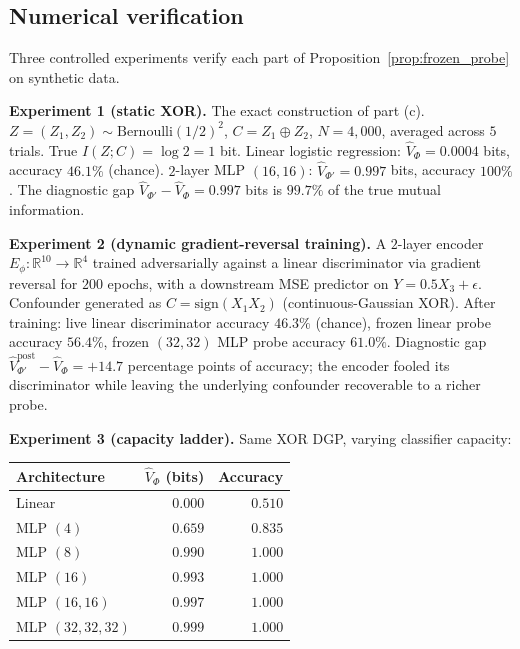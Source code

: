 \documentclass{article}
\begin{document}
\subsection{Numerical verification}
\label{app:frozen_probe_numerical}

Three controlled experiments verify each part of Proposition~\ref{prop:frozen_probe} on synthetic data.

\textbf{Experiment 1 (static XOR).} The exact construction of part (c). $Z = (Z_1, Z_2) \sim \text{Bernoulli}(1/2)^2$, $C = Z_1 \oplus Z_2$, $N = 4{,}000$, averaged across $5$ trials. True $I(Z; C) = \log 2 = 1$ bit. Linear logistic regression: $\hat V_\Phi = 0.0004$ bits, accuracy $46.1\%$ (chance). $2$-layer MLP $(16,16)$: $\hat V_{\Phi'} = 0.997$ bits, accuracy $100\%$. The diagnostic gap $\hat V_{\Phi'} - \hat V_\Phi = 0.997$ bits is $99.7\%$ of the true mutual information.

\textbf{Experiment 2 (dynamic gradient-reversal training).} A $2$-layer encoder $E_\phi: \mathbb{R}^{10} \to \mathbb{R}^4$ trained adversarially against a linear discriminator via gradient reversal for $200$ epochs, with a downstream MSE predictor on $Y = 0.5 X_3 + \epsilon$. Confounder generated as $C = \mathrm{sign}(X_1 X_2)$ (continuous-Gaussian XOR). After training: live linear discriminator accuracy $46.3\%$ (chance), frozen linear probe accuracy $56.4\%$, frozen $(32, 32)$ MLP probe accuracy $61.0\%$. Diagnostic gap $\hat V_{\Phi'}^{\text{post}} - \hat V_\Phi = +14.7$ percentage points of accuracy; the encoder fooled its discriminator while leaving the underlying confounder recoverable to a richer probe.

\textbf{Experiment 3 (capacity ladder).} Same XOR DGP, varying classifier capacity:
\begin{center}
\begin{tabular}{lrr}
\toprule
\textbf{Architecture} & $\hat V_\Phi$ (bits) & Accuracy \\
\midrule
Linear & $0.000$ & $0.510$ \\
MLP $(4)$ & $0.659$ & $0.835$ \\
MLP $(8)$ & $0.990$ & $1.000$ \\
MLP $(16)$ & $0.993$ & $1.000$ \\
MLP $(16, 16)$ & $0.997$ & $1.000$ \\
MLP $(32, 32, 32)$ & $0.999$ & $1.000$ \\
\bottomrule
\end{tabular}
\end{center}
\end{document}
